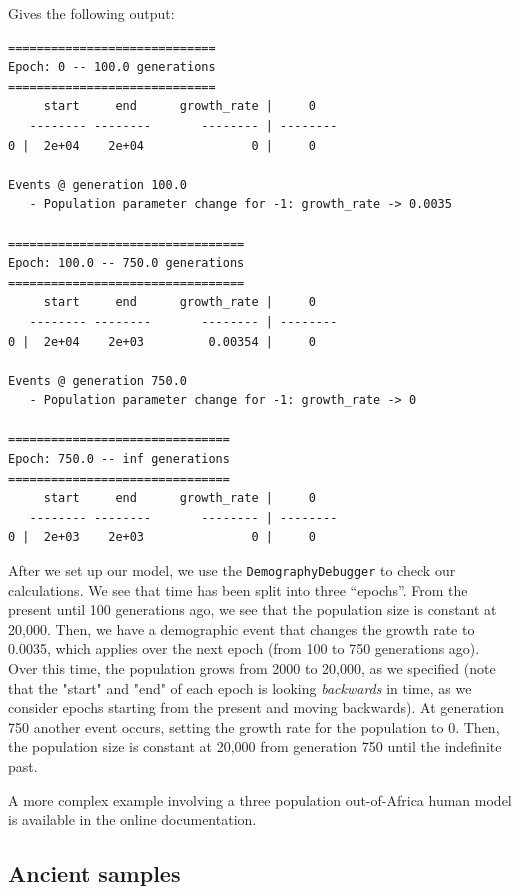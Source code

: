 \documentclass[graybox]{svmult}
\begin{document}
Gives the following output:
\begin{footnotesize}
\begin{verbatim}
=============================
Epoch: 0 -- 100.0 generations
=============================
     start     end      growth_rate |     0
   -------- --------       -------- | --------
0 |  2e+04    2e+04               0 |     0

Events @ generation 100.0
   - Population parameter change for -1: growth_rate -> 0.0035

=================================
Epoch: 100.0 -- 750.0 generations
=================================
     start     end      growth_rate |     0
   -------- --------       -------- | --------
0 |  2e+04    2e+03         0.00354 |     0

Events @ generation 750.0
   - Population parameter change for -1: growth_rate -> 0

===============================
Epoch: 750.0 -- inf generations
===============================
     start     end      growth_rate |     0
   -------- --------       -------- | --------
0 |  2e+03    2e+03               0 |     0

\end{verbatim}
\end{footnotesize}

    After we set up our model, we use the \texttt{DemographyDebugger} to
check our calculations. We see that time has been split into three
``epochs''. From the present until 100 generations ago, we see that the
population size is constant at 20,000. Then, we have a demographic event
that changes the growth rate to 0.0035, which applies over the next
epoch (from 100 to 750 generations ago). Over this time, the population
grows from 2000 to 20,000, as we specified (note that the "start" and
"end" of each epoch is looking \emph{backwards} in time, as we consider
epochs starting from the present and moving backwards). At generation
750 another event occurs, setting the growth rate for the population to
0. Then, the population size is constant at 20,000 from generation 750
until the indefinite past.

A more complex example involving a three population out-of-Africa human
model is available in the online documentation.

\subsection{Ancient samples}\label{ancient-samples}
\end{document}
